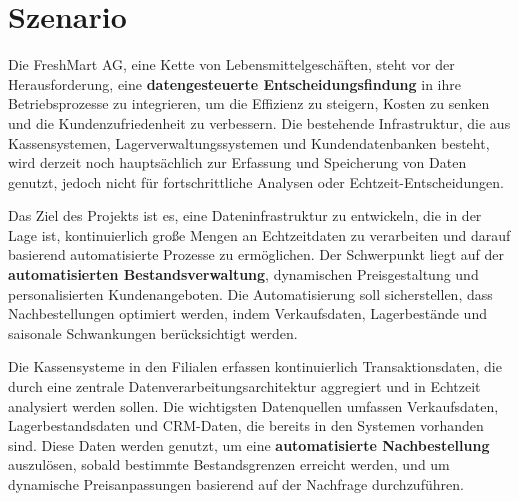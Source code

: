 \documentclass[%
pdftex,
oneside,			%
11pt,				%
parskip=half,		%
headheight = 12pt,	%
headsepline,		%
footsepline,		%
footheight = 16pt,	%
abstracton,		%
DIV=calc,		%
BCOR=8mm,		%
headinclude=false,	%
footinclude=false,	%
listof=totoc,		%
toc=bibliography,	%
]{scrreprt}	%
\newcommand{\comment}[1]{\par {\bfseries \color{blue} #1 \par}} %
\begin{document}
\newpage






\section{Szenario}

    Die FreshMart AG, eine Kette von Lebensmittelgeschäften, steht vor der Herausforderung, eine \textbf{datengesteuerte Entscheidungsfindung} in ihre Betriebsprozesse zu integrieren, um die Effizienz zu steigern, Kosten zu senken und die Kundenzufriedenheit zu verbessern. 
    Die bestehende Infrastruktur, die aus Kassensystemen, Lagerverwaltungssystemen und Kundendatenbanken besteht, wird derzeit noch hauptsächlich zur Erfassung und Speicherung von Daten genutzt, jedoch nicht für fortschrittliche Analysen oder Echtzeit-Entscheidungen.

    Das Ziel des Projekts ist es, eine Dateninfrastruktur zu entwickeln, die in der Lage ist, kontinuierlich große Mengen an Echtzeitdaten zu verarbeiten und darauf basierend automatisierte Prozesse zu ermöglichen. Der Schwerpunkt liegt auf der \textbf{automatisierten Bestandsverwaltung}, dynamischen Preisgestaltung und personalisierten Kundenangeboten. 
    Die Automatisierung soll sicherstellen, dass Nachbestellungen optimiert werden, indem Verkaufsdaten, Lagerbestände und saisonale Schwankungen berücksichtigt werden.

    Die Kassensysteme in den Filialen erfassen kontinuierlich Transaktionsdaten, die durch eine zentrale Datenverarbeitungsarchitektur aggregiert und in Echtzeit analysiert werden sollen. 
    Die wichtigsten Datenquellen umfassen Verkaufsdaten, Lagerbestandsdaten und CRM-Daten, die bereits in den Systemen vorhanden sind. 
    Diese Daten werden genutzt, um eine \textbf{automatisierte Nachbestellung} auszulösen, sobald bestimmte Bestandsgrenzen erreicht werden, und um dynamische Preisanpassungen basierend auf der Nachfrage durchzuführen.
\end{document}
